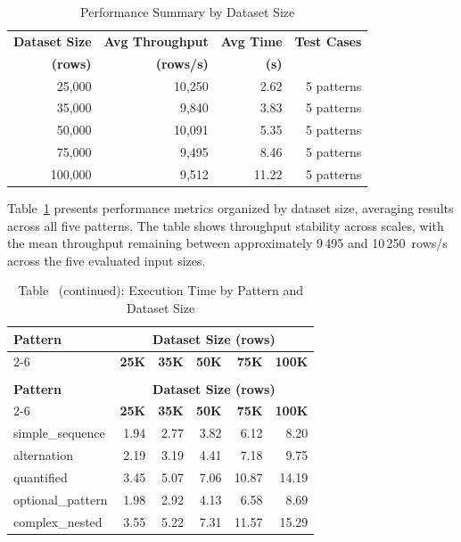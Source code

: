 \begin{table}[H]
\centering
\caption{Performance Summary by Dataset Size}
\label{tab:size_summary}
\begin{tabular}{rrrr}
\toprule
\textbf{Dataset Size} & \textbf{Avg Throughput} & \textbf{Avg Time}
  & \textbf{Test Cases} \\
\textbf{(rows)} & \textbf{(rows/s)} & \textbf{(s)} & \\
\midrule
 25{,}000 & 10{,}250 &  2.62 & 5 patterns \\
 35{,}000 &  9{,}840 &  3.83 & 5 patterns \\
 50{,}000 & 10{,}091 &  5.35 & 5 patterns \\
 75{,}000 &  9{,}495 &  8.46 & 5 patterns \\
100{,}000 &  9{,}512 & 11.22 & 5 patterns \\
\bottomrule
\end{tabular}
\end{table}

Table~\ref{tab:size_summary} presents performance metrics organized by
dataset size, averaging results across all five patterns.  The table
shows throughput stability across scales, with the mean throughput
remaining between approximately 9\,495 and 10\,250~rows/s across the
five evaluated input sizes.

\begin{longtable}{lrrrrr}
\caption{Execution Time (seconds) by Pattern and Dataset Size}
\label{tab:execution_times} \\
\toprule
\textbf{Pattern} & \multicolumn{5}{c}{\textbf{Dataset Size (rows)}} \\
\cmidrule(lr){2-6}
 & \textbf{25K} & \textbf{35K} & \textbf{50K} & \textbf{75K} & \textbf{100K} \\
\midrule
\endfirsthead
\caption*{Table~\thetable{} (continued): Execution Time by Pattern and Dataset Size} \\
\toprule
\textbf{Pattern} & \multicolumn{5}{c}{\textbf{Dataset Size (rows)}} \\
\cmidrule(lr){2-6}
 & \textbf{25K} & \textbf{35K} & \textbf{50K} & \textbf{75K} & \textbf{100K} \\
\midrule
\endhead
\bottomrule
\endfoot
simple\_sequence  & 1.94 &  2.77 &  3.82 &  6.12 &  8.20 \\
alternation       & 2.19 &  3.19 &  4.41 &  7.18 &  9.75 \\
quantified        & 3.45 &  5.07 &  7.06 & 10.87 & 14.19 \\
optional\_pattern & 1.98 &  2.92 &  4.13 &  6.58 &  8.69 \\
complex\_nested   & 3.55 &  5.22 &  7.31 & 11.57 & 15.29 \\
\end{longtable}

